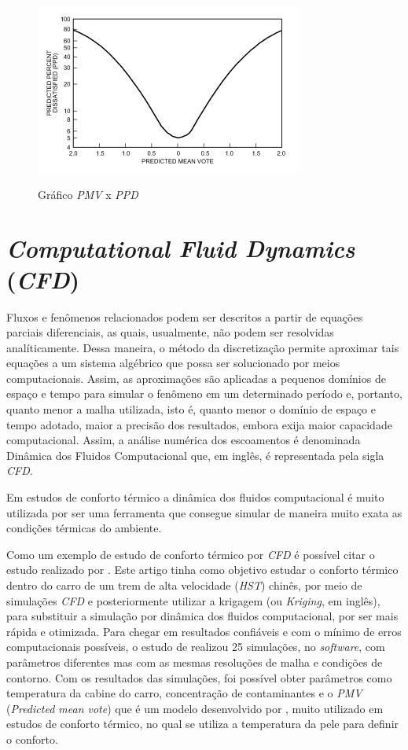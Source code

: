 \documentclass[acronym,symbols,table]{fei}
\begin{document}
\begin{figure}[!htp] 
 \centering
    \caption{Gráfico \textit{PMV} x \textit{PPD}}
    \includegraphics[width=0.6\linewidth]{Imagens/grafico-pmv-ppd.jpeg}
    \label{fig:graficopmvppd}
\end{figure}

\section{\textit{Computational Fluid Dynamics} (\textit{CFD})}

Fluxos e fenômenos relacionados podem ser descritos a partir de equações parciais diferenciais, as quais, usualmente, não podem ser resolvidas analíticamente. Dessa maneira, o método da discretização permite aproximar tais equações a um sistema algébrico que possa ser solucionado por meios computacionais. Assim, as aproximações são aplicadas a pequenos domínios de espaço e tempo \cite{peric2002computational} para simular o fenômeno em um determinado período e, portanto, quanto menor a malha utilizada, isto é, quanto menor o domínio de espaço e tempo adotado, maior a precisão dos resultados, embora exija maior capacidade computacional. Assim, a análise numérica dos escoamentos é denominada Dinâmica dos Fluidos Computacional que, em inglês, é representada pela sigla \textit{CFD}. 

Em estudos de conforto térmico a dinâmica dos fluidos computacional é muito utilizada por ser uma ferramenta que consegue simular de maneira muito exata as condições térmicas do ambiente.   

Como um exemplo de estudo de conforto térmico por \textit{CFD} é possível citar o estudo realizado por \textcite{li2019multi}. Este artigo tinha como objetivo estudar o conforto térmico dentro do carro de um trem de alta velocidade (\textit{HST}) chinês, por meio de simulações \textit{CFD} e posteriormente utilizar a krigagem (ou \textit{Kriging}, em inglês), para substituir a simulação por dinâmica dos fluidos computacional, por ser mais rápida e otimizada. Para chegar em resultados confiáveis e com o mínimo de erros computacionais possíveis, o estudo de \textcite{li2019multi} realizou 25 simulações, no \textit{software}, com parâmetros diferentes mas com as mesmas resoluções de malha e condições de contorno. Com os resultados das simulações, foi possível obter parâmetros como temperatura da cabine do carro, concentração de contaminantes e o \textit{PMV} (\textit{Predicted mean vote}) que é um modelo desenvolvido por \textcite{fanger1970thermal}, muito utilizado em estudos de conforto térmico, no qual se utiliza a temperatura da pele para definir o conforto.
\end{document}
